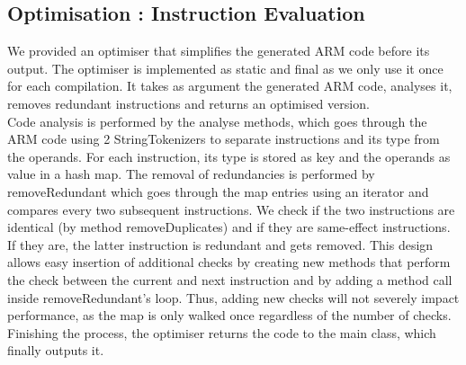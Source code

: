 \documentclass[a4paper]{article}
\theoremstyle{definition}
\begin{document}
\subsection{Optimisation : Instruction Evaluation}
We provided an optimiser that simplifies the generated ARM code before its output. The optimiser is implemented as static and final as we only use it once for each compilation. It takes as argument the generated ARM code, analyses it, removes redundant instructions and returns an optimised version. \\
\phantom{3ex} Code analysis is performed by the analyse methods, which goes through the ARM code using 2 StringTokenizers to separate instructions and its type from the operands. For each instruction, its type is stored as key and the operands as value in a hash map. The removal of redundancies is performed by removeRedundant which goes through the map entries using an iterator and compares every two subsequent instructions. We check if the two instructions are identical (by method removeDuplicates) and if they are same-effect instructions. If they are, the latter instruction is redundant and gets removed. This design allows easy insertion of additional checks by creating new methods that perform the check between the current and next instruction and by adding a method call inside removeRedundant’s loop. Thus, adding new checks will not severely impact performance, as the map is only walked once regardless of the number of checks. Finishing the process, the optimiser returns the code to the main class, which finally outputs it.
\end{document}
